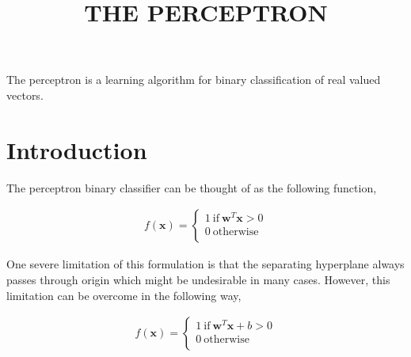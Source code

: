 \documentclass[11pt, a4paper]{article}
\begin{document}
\title{THE PERCEPTRON}
\date{}
\maketitle

The perceptron is a learning algorithm for binary classification of real valued vectors. 

\section{Introduction}

The perceptron binary classifier can be thought of as the following function,

\begin{align*}
	f(\boldsymbol{x}) = \left\{                       
	\begin{array}{ll}                                 
	1\ \text{if}\ \boldsymbol{w}^T \boldsymbol{x} > 0 \\
	0\ \text{otherwise}                               \\
	\end{array}                                       
	\right.                                           
\end{align*}

\begin{figure}[htbp]
	\centering
\end{figure}

One severe limitation of this formulation is that the separating hyperplane always passes through origin which might be undesirable in many cases. However, this limitation can be overcome in the following way,

\begin{align*}
	f(\boldsymbol{x}) = \left\{                           
	\begin{array}{ll}                                     
	1\ \text{if}\ \boldsymbol{w}^T \boldsymbol{x} + b > 0 \\
	0\ \text{otherwise}                                   \\
	\end{array}                                           
	\right.                                               
\end{align*}
\end{document}
